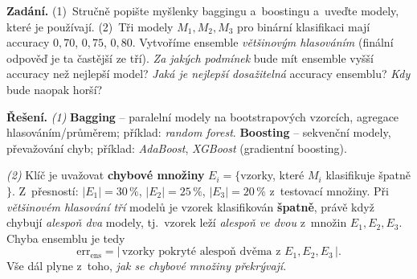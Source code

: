 \begin{priklad}
\par
\textbf{Zadání.} (1)~Stručně popište myšlenky baggingu a~boostingu a~uveďte modely, které je používají. (2)~Tři modely $M_1,M_2,M_3$ pro binární klasifikaci mají accuracy $0{,}70$, $0{,}75$, $0{,}80$. Vytvoříme ensemble \emph{většinovým hlasováním} (finální odpověď je ta častější ze tří). \emph{Za jakých podmínek} bude mít ensemble vyšší accuracy než nejlepší model? \emph{Jaká je nejlepší dosažitelná} accuracy ensemblu? \emph{Kdy} bude naopak horší?

\smallskip
\textbf{Řešení.}
\emph{(1)} \textbf{Bagging} -- paralelní modely na bootstrapových vzorcích, agregace hlasováním/průměrem; příklad: \emph{random forest}. \textbf{Boosting} -- sekvenční modely, převažování chyb; příklad: \emph{AdaBoost}, \emph{XGBoost} (gradientní boosting).

\emph{(2)} Klíč je uvažovat \textbf{chybové množiny} $E_i=\{$vzorky, které $M_i$ klasifikuje špatně$\}$. Z~přesností: $|E_1|=30\,\%$, $|E_2|=25\,\%$, $|E_3|=20\,\%$ z~testovací množiny. Při \emph{většinovém hlasování tří} modelů je vzorek klasifikován \textbf{špatně}, právě když chybují \emph{alespoň dva} modely, tj.\ vzorek leží \emph{alespoň ve dvou} z~množin $E_1,E_2,E_3$. Chyba ensemblu je tedy
\[ \mathrm{err}_{\mathrm{ens}} = \big|\,\text{vzorky pokryté alespoň dvěma z~}E_1,E_2,E_3\,\big|. \]
Vše dál plyne z~toho, \emph{jak se chybové množiny překrývají}.


\end{priklad}
